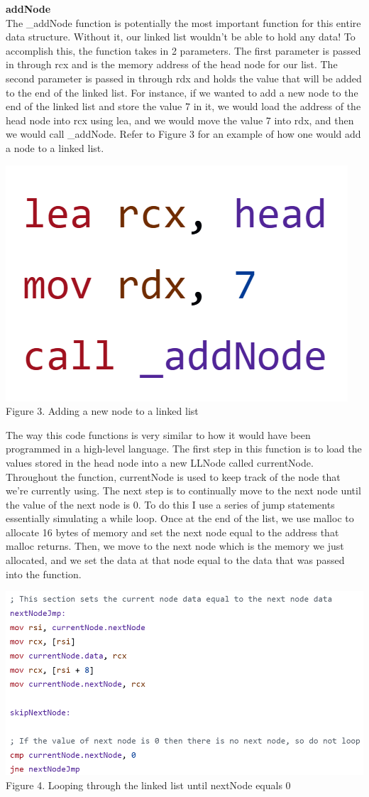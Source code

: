 \documentclass[twoside]{article}
\begin{document}
\noindent \textbf{\large addNode} \\
\noindent The \_addNode function is potentially the most important function for this entire data structure. Without it, our linked list wouldn’t be able to hold any data! To accomplish this, the function takes in 2 parameters. The first parameter is passed in through rcx and is the memory address of the head node for our list. The second parameter is passed in through rdx and holds the value that will be added to the end of the linked list. For instance, if we wanted to add a new node to the end of the linked list and store the value 7 in it, we would load the address of the head node into rcx using lea, and we would move the value 7 into rdx, and then we would call \_addNode. Refer to Figure 3 for an example of how one would add a node to a linked list.
\begin{center}
    \includegraphics[width=.25\textwidth]{images/addNode.png}\\
    Figure 3. Adding a new node to a linked list
\end{center}

\noindent The way this code functions is very similar to how it would have been programmed in a high-level language. The first step in this function is to load the values stored in the head node into a new LLNode called currentNode. Throughout the function, currentNode is used to keep track of the node that we’re currently using. The next step is to continually move to the next node until the value of the next node is 0. To do this I use a series of jump statements essentially simulating a while loop. Once at the end of the list, we use malloc to allocate 16 bytes of memory and set the next node equal to the address that malloc returns. Then, we move to the next node which is the memory we just allocated, and we set the data at that node equal to the data that was passed into the function.
\begin{center}
    \includegraphics[width=.85\textwidth]{images/addNodeLoop.png}\\
    Figure 4. Looping through the linked list until nextNode equals 0
\end{center}
\end{document}
